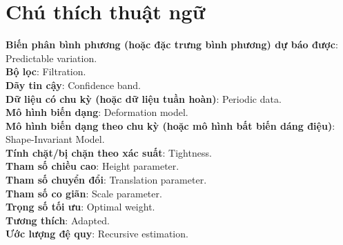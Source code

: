 \chapter*{Chú thích thuật ngữ}
\textbf{Biến phân bình phương (hoặc đặc trưng bình phương) dự báo được}: Predictable variation.\\
\textbf{Bộ lọc}: Filtration.\\
\textbf{Dãy tin cậy}: Confidence band.\\
\textbf{Dữ liệu có chu kỳ (hoặc dữ liệu tuần hoàn)}: Periodic data.\\
\textbf{Mô hình biến dạng}: Deformation model.\\
\textbf{Mô hình biến dạng theo chu kỳ (hoặc mô hình bất biến dáng điệu)}: Shape-Invariant Model.\\
\textbf{Tính chặt/bị chặn theo xác suất}: Tightness.\\
\textbf{Tham số chiều cao}: Height parameter.\\
\textbf{Tham số chuyển đổi}: Translation parameter.\\
\textbf{Tham số co giãn}: Scale parameter.\\
\textbf{Trọng số tối ưu}: Optimal weight.\\
\textbf{Tương thích}: Adapted.\\
\textbf{Ước lượng đệ quy}: Recursive estimation.\\

